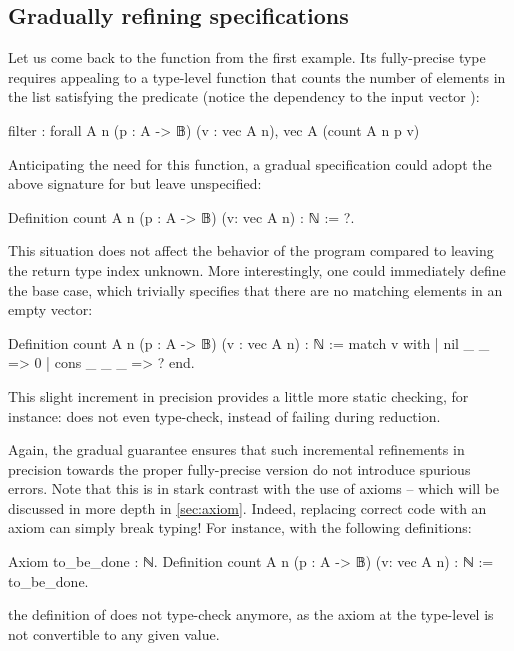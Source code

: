 \subsection{Gradually refining specifications}
\label{sec:specif}
  
Let us come back to the  function from the first example.
Its fully-precise type requires appealing to a type-level function that counts the number of
elements in the list satisfying the predicate
(notice the dependency to the input vector ):
\begin{coqcode}
  filter : forall A n (p : A -> 𝔹) (v : vec A n),
            vec A (count A n p v)
\end{coqcode}

Anticipating the need for this function, a gradual specification could adopt the above
signature for  but leave  unspecified:
\begin{coqcode}
Definition count A n (p : A -> 𝔹) (v: vec A n) : ℕ := ?.
\end{coqcode}

This situation does not affect the behavior of the program compared to leaving the return type index unknown. More interestingly, one could immediately define the base case, which trivially specifies that there are no matching elements in an empty vector:
\begin{coqcode}
Definition count A n (p : A -> 𝔹) (v : vec A n) : ℕ :=
  match v with
  | nil _ _ => 0
  | cons _ _ _ => ?
  end.
\end{coqcode}

This slight increment in precision provides a little more static checking, for instance:
does not even type-check, instead of failing during reduction.

Again, the gradual guarantee ensures that such incremental refinements in precision towards the proper fully-precise version do not introduce spurious errors.
Note that this is in stark contrast with the use of axioms – which will be discussed in more depth in \cref{sec:axiom}. Indeed, replacing correct code with an axiom can simply break typing! For instance, with the following definitions:
\begin{coqcode}
Axiom to_be_done : ℕ.
Definition count A n (p : A -> 𝔹) (v: vec A n) : ℕ :=
  to_be_done.
\end{coqcode}
the definition of  does not type-check anymore,
as the axiom at the type-level is not convertible to any given value.

